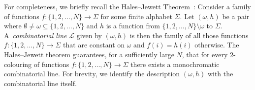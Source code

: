 \documentclass{elsarticle}
\theoremstyle{plain}
\theoremstyle{definition}
\theoremstyle{remark}
\begin{document}
For completeness, we briefly recall the Hales--Jewett Theorem~\cite{Hales1963}:
Consider a family of functions $f\colon \{1,2,\ldots, N\} \to \Sigma$ for some finite alphabet $\Sigma$. Let $(\omega,h)$ be a pair where $\emptyset\neq\omega\subseteq \{1,2,\ldots, N\}$ and $h$ is a function from $\{1,2,\ldots, N\}\setminus \omega$ to $\Sigma$. A~\emph{combinatorial line} $\mathcal L$ given by $(\omega,h)$ is then the family of all those functions $f\colon\{1,2,\ldots, N\} \to \Sigma$ that are constant on $\omega$ and $f(i)=h(i)$ otherwise. The Hales--Jewett theorem guarantees, for a sufficiently large $N$, that for every $2$-colouring of functions $f\colon\{1,2,\ldots, N\} \to \Sigma$ there exists a monochromatic combinatorial line. For brevity, we identify the description $(\omega,h)$ with the combinatorial line itself.
\end{document}
